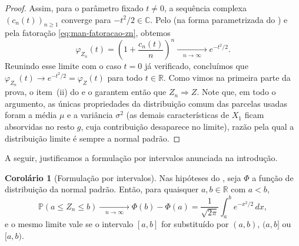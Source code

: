 \documentclass[12pt,portuguese]{article}
\theoremstyle{definition}
\newtheorem{corollary}[corollary]{Corolário}
\theoremstyle{plainexercise}
\theoremstyle{starredexercise}
\theoremstyle{definition}
\begin{document}
\begin{proof}
Assim, para o parâmetro fixado $t\neq0$, a sequência complexa
$(c_n(t))_{n\geqslant1}$ converge para $-t^2/2\in\mathbb{C}$. Pelo
 (na forma parametrizada do
) e pela fatoração
\eqref{eq:man-fatoracao-zn}, obtemos
\[
\varphi_{Z_n}(t)
=\left(1+\frac{c_n(t)}{n}\right)^{\!n}
\xrightarrow[\quad n\to\infty\quad]{}e^{-t^2/2}.
\]
Reunindo esse limite com o caso $t=0$ já verificado, concluímos que
$\varphi_{Z_n}(t)\to e^{-t^2/2}=\varphi_Z(t)$ para todo $t\in\mathbb{R}$.
Como vimos na primeira parte da prova, o item~(ii) do
 e o  garantem então que $Z_n\Rightarrow Z$.
Note que, em todo o argumento, as únicas propriedades da distribuição comum das parcelas usadas
foram a média $\mu$ e a variância $\sigma^2$ (as demais características de $X_1$ ficam
absorvidas no resto $g$, cuja contribuição desaparece no limite), razão
pela qual a distribuição limite é sempre a normal padrão.
\end{proof}

A seguir, justificamos a formulação por intervalos anunciada na introdução.

\begin{corollary}[Formulação por intervalos]\label{cor:tlc-intervalos}
Nas hipóteses do , seja $\Phi$ a função de distribuição
da normal padrão. Então, para quaisquer $a,b\in\mathbb{R}$ com $a<b$,
\[
\mathbb{P}(a\leqslant Z_n\leqslant b)
\xrightarrow[\quad n\to\infty\quad]{}
\Phi(b)-\Phi(a)
=\frac{1}{\sqrt{2\pi}}\int_a^b e^{-x^2/2}\,dx,
\]
e o mesmo limite vale se o intervalo $[a,b]$ for substituído por $(a,b)$,
$(a,b]$ ou $[a,b)$.
\end{corollary}
\end{document}
